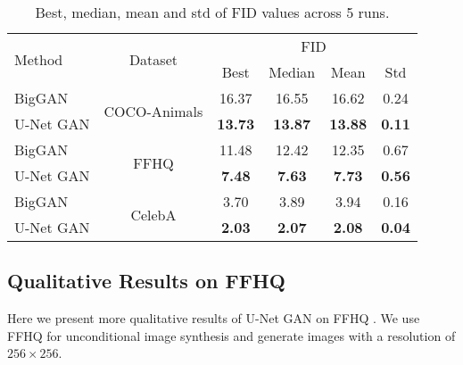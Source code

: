 \documentclass[10pt,twocolumn,letterpaper]{article}
\begin{document}
 \begin{table}[t]
	\vspace{-0em}
	\setlength{\tabcolsep}{0.5em}
	\renewcommand{\arraystretch}{0.8}
	\centering


\begin{tabular}{l c c c  c  c }
    \multirow{2}{*}{\footnotesize Method}    & \multirow{2}{*}{ \footnotesize Dataset} & \multicolumn{4}{c}{ \footnotesize FID} \\
       &  &  \footnotesize Best &  \footnotesize Median &  \footnotesize Mean  &  \footnotesize Std \\
    	\hline

  	\footnotesize BigGAN    & \multirow{2}{*}{ \footnotesize COCO-Animals} & \footnotesize 16.37 & \footnotesize 16.55 & \footnotesize 16.62 & \footnotesize 0.24 \\
     	\footnotesize U-Net GAN &  & \footnotesize  \textbf{13.73} & \footnotesize \textbf{13.87} & \footnotesize \textbf{13.88} & \footnotesize \textbf{0.11} \\
    	\hline
    	\footnotesize BigGAN    &  \multirow{2}{*}{ \footnotesize FFHQ}   & \footnotesize  11.48 & \footnotesize 12.42 & \footnotesize 12.35 & \footnotesize 0.67 \\
     	\footnotesize U-Net GAN &   & \footnotesize  \textbf{7.48}  & \footnotesize \textbf{7.63}  & \footnotesize \textbf{7.73}  & \footnotesize \textbf{0.56} \\
	\hline
      	\footnotesize BigGAN    &  \multirow{2}{*}{ \footnotesize CelebA}   & \footnotesize  3.70 & \footnotesize 3.89 & \footnotesize 3.94 & \footnotesize 0.16 \\
      	\footnotesize U-Net GAN &   & \footnotesize  \textbf{2.03}  & \footnotesize \textbf{2.07}  & \footnotesize \textbf{2.08}  & \footnotesize \textbf{0.04} \\
	\end{tabular}
	\caption{ Best, median, mean and std of FID values across 5 runs.} \label{table:fids_long}
	\vspace{-1.5em}
\end{table}
 

 \subsection{Qualitative Results on FFHQ}\label{sec:syn samples_ffhq}
Here we present more qualitative results of U-Net GAN on FFHQ \cite{Karras2018ASG}.
We use FFHQ for unconditional image synthesis and generate images with a resolution of $256\times 256$.
\end{document}
